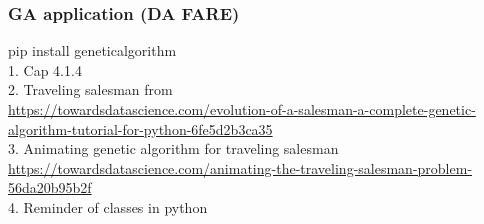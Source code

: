 \subsubsection{GA application (DA FARE)}
pip install geneticalgorithm
\\
1. Cap 4.1.4 \cite{RusselNorvig:2009dg}\\
2. Traveling salesman from\\ \url{https://towardsdatascience.com/evolution-of-a-salesman-a-complete-genetic-algorithm-tutorial-for-python-6fe5d2b3ca35}\\
3. Animating genetic algorithm for traveling salesman \url{https://towardsdatascience.com/animating-the-traveling-salesman-problem-56da20b95b2f}\\
4. Reminder of classes in python